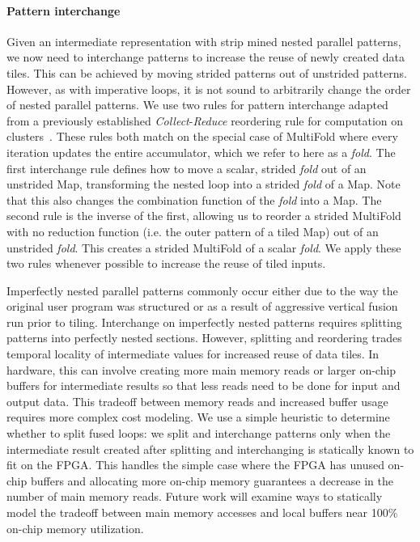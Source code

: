 \paragraph{Pattern interchange}
Given an intermediate representation with strip mined nested parallel patterns, we now need to interchange patterns to increase the reuse
of newly created data tiles. This can be achieved by moving strided patterns out of unstrided patterns. However, as with imperative loops,
it is not sound to arbitrarily change the order of nested parallel patterns.
We use two rules for pattern interchange adapted from a previously established \emph{Collect}-\emph{Reduce} reordering rule for computation on clusters~\cite{brown16clusters}.
These rules both match on the special case of MultiFold where every iteration updates the entire accumulator, which we refer to here as a \emph{fold}.
The first interchange rule defines how to move a scalar, strided \emph{fold} out of an unstrided Map, transforming the nested loop into a strided \emph{fold} of a Map.
Note that this also changes the combination function of the \emph{fold} into a Map.
The second rule is the inverse of the first, allowing us to reorder a strided MultiFold with no reduction function (i.e. the outer pattern of a tiled Map)
out of an unstrided \emph{fold}. This creates a strided MultiFold of a scalar \emph{fold}. We apply these two rules whenever possible to increase the reuse
of tiled inputs.



Imperfectly nested parallel patterns commonly occur either due to the way the original user program was structured or
as a result of aggressive vertical fusion run prior to tiling.
Interchange on imperfectly nested patterns requires splitting patterns into perfectly nested sections. However, splitting and reordering trades
temporal locality of intermediate values for increased reuse of data tiles. In hardware, this can involve creating more main memory
reads or larger on-chip buffers for intermediate results so that less reads need to be done for input and output data. This tradeoff between memory reads and
increased buffer usage requires more complex cost modeling.
We use a simple heuristic to determine whether to split fused loops: we split and interchange patterns only when
the intermediate result created after splitting and interchanging is statically known to fit on the FPGA. This handles the simple case
where the FPGA has unused on-chip buffers and allocating more on-chip memory guarantees a decrease in the number of main memory reads.
Future work will examine ways to statically model the tradeoff between main memory accesses and local buffers near 100\% on-chip memory utilization.



